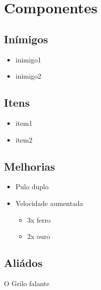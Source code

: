 \chapter{Componentes}\label{cap:ferramentas}

\lipsum[10]

\section{Inímigos}
\lipsum[23]
\begin{itemize}
    \item inimigo1
    \item inimigo2
\end{itemize}

\section{Itens}
\lipsum[23]
\begin{itemize}
    \item item1
    \item item2
\end{itemize}

\section{Melhorias}
\lipsum[23]
\begin{itemize}
    \item Pulo duplo
    \item Velocidade aumentada
    \begin{itemize}
        \item 3x ferro
        \item 2x ouro
    \end{itemize}
\end{itemize}

\section{Aliádos}
O Grilo falante

\lipsum[23]
